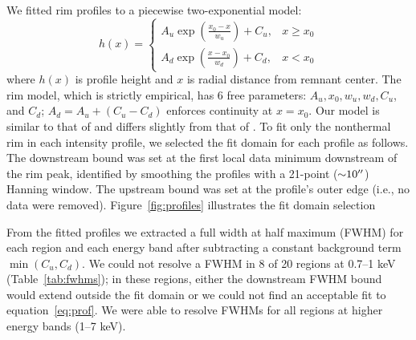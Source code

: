\documentclass[iop, apj, numberedappendix]{emulateapj}
\newcommand*{\mt}{\mathrm}
\newcommand*{\unit}[1]{\;\mt{#1}}  %
\newcommand*{\abt}{\mathord{\sim}} %
\begin{document}
We fitted rim profiles to a piecewise two-exponential model:
\begin{equation} \label{eq:prof}
    h(x) =
    \begin{cases}
        A_u \exp \left(\frac{x_0 - x}{w_u}\right) + C_u, &x \geq x_0 \\
        A_d \exp \left(\frac{x - x_0}{w_d}\right) + C_d, &x < x_0
    \end{cases}
\end{equation}
where $h(x)$ is profile height and $x$ is radial distance from remnant center.
The rim model, which is strictly empirical, has 6 free parameters:
$A_u, x_0, w_u, w_d, C_u$, and $C_d$; $A_d = A_u + (C_u - C_d)$ enforces
continuity at $x=x_0$. Our model is similar to that of \citet{bamba2003,
bamba2005-hist} and differs slightly from that of .
To fit only the nonthermal rim in each intensity profile, we selected the fit
domain for each profile as follows.  The downstream bound was set at the first
local data minimum downstream of the rim peak, identified by smoothing the
profiles with a 21-point ($\abt 10\arcsec$) Hanning window.  The upstream bound
was set at the profile's outer edge (i.e., no data were removed).
Figure~\ref{fig:profiles} illustrates the fit domain selection

\begin{figure*}%
    \iftoggle{manuscript}{
        \epsscale{1}
    }{}
    \caption{Best fit profiles with measured FWHMs demarcated for each energy
        band in Region 1 (top) and Region 16 (bottom).  Hereafter, we use
        Regions 1 and 16 to illustrate results for profiles of differing
        quality and absolute width.  We could not measure a $0.7$--$1
        \unit{keV}$ FWHM in Region 1, reflected in Table~\ref{tab:fwhms}.  Data
        in red were excluded from profile fit domains as described in text.}
    \label{fig:profiles}
\end{figure*}

From the fitted profiles we extracted a full width at half maximum (FWHM) for
each region and each energy band after subtracting a constant background term
$\min(C_u, C_d)$.  We could not resolve a FWHM in 8 of 20 regions at 0.7--1 keV
(Table~\ref{tab:fwhms}); in these regions, either the downstream FWHM bound
would extend outside the fit domain or we could not find an acceptable fit to
equation~\eqref{eq:prof}.  We were able to resolve FWHMs for all regions at
higher energy bands (1--7 keV).
\end{document}

